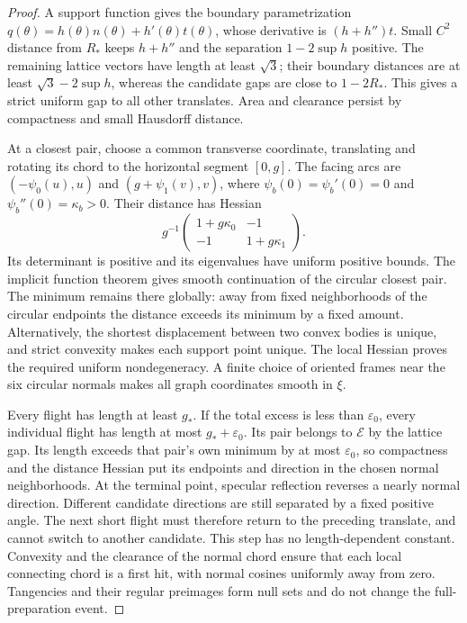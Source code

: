 \begin{proof}
A support function gives the boundary parametrization
$q(\theta)=h(\theta)n(\theta)+h'(\theta)t(\theta)$, whose derivative
is $(h+h'')t$. Small $C^2$ distance from $R_*$ keeps $h+h''$ and the
separation $1-2\sup h$ positive. The remaining lattice vectors have
length at least $\sqrt3$; their boundary distances are at least
$\sqrt3-2\sup h$, whereas the candidate gaps are close to $1-2R_*$.
This gives a strict uniform gap to all other translates. Area and
clearance persist by compactness and small Hausdorff distance.

At a closest pair, choose a common transverse coordinate, translating
and rotating its chord to the horizontal segment $[0,g]$. The facing
arcs are $(-\psi_0(u),u)$ and $(g+\psi_1(v),v)$, where
$\psi_b(0)=\psi_b'(0)=0$ and $\psi_b''(0)=\kappa_b>0$. Their distance
has Hessian
\begin{equation}\label{eq:g-single-hessian}
 g^{-1}\begin{pmatrix}1+g\kappa_0&-1\\-1&1+g\kappa_1\end{pmatrix}.
\end{equation}
Its determinant is positive and its eigenvalues have uniform positive
bounds. The implicit function theorem gives smooth continuation of the
circular closest pair. The minimum remains there globally: away from
fixed neighborhoods of the circular endpoints the distance exceeds its
minimum by a fixed amount. Alternatively, the shortest displacement
between two convex bodies is unique, and strict convexity makes each
support point unique. The local Hessian proves the required uniform
nondegeneracy. A finite choice of oriented frames near the six circular
normals makes all graph coordinates smooth in $\xi$.

Every flight has length at least $g_*$. If the total excess is less
than $\varepsilon_0$, every individual flight has length at most
$g_*+\varepsilon_0$. Its pair belongs to $\mathcal E$ by the lattice
gap. Its length exceeds that pair's own minimum by at most
$\varepsilon_0$, so compactness and the distance Hessian put its
endpoints and direction in the chosen normal neighborhoods. At the
terminal point, specular reflection reverses a nearly normal direction.
Different candidate directions are still separated by a fixed positive
angle. The next short flight must therefore return to the preceding
translate, and cannot switch to another candidate. This step has no
length-dependent constant. Convexity and the clearance of the normal
chord ensure that each local connecting chord is a first hit, with
normal cosines uniformly away from zero. Tangencies and their regular
preimages form null sets and do not change the full-preparation event.
\end{proof}

